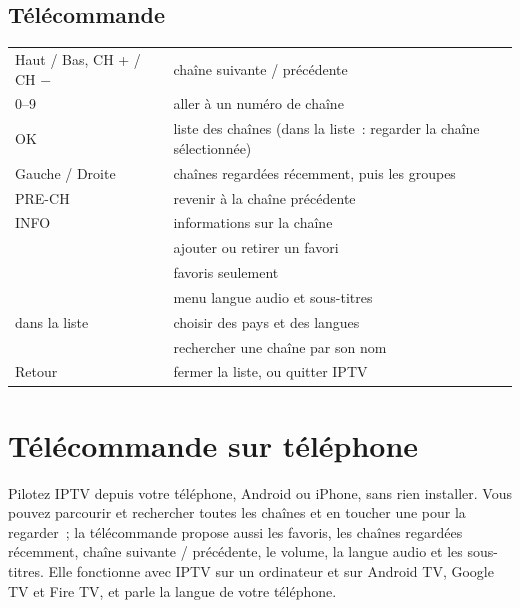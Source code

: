 \subsection{Télécommande}
\begin{xltabular}{\linewidth}{@{}KX@{}}
Haut / Bas, CH + / CH $-$ & chaîne suivante / précédente \\
0--9 & aller à un numéro de chaîne \\
OK & liste des chaînes (dans la liste~: regarder la chaîne sélectionnée) \\
Gauche / Droite & chaînes regardées récemment, puis les groupes \\
PRE-CH & revenir à la chaîne précédente \\
INFO & informations sur la chaîne \\
 & ajouter ou retirer un favori \\
 & favoris seulement \\
 & menu langue audio et sous-titres \\
 dans la liste & choisir des pays et des langues \\
 & rechercher une chaîne par son nom \\
Retour & fermer la liste, ou quitter IPTV \\
\bottomrule
\end{xltabular}


\section{Télécommande sur téléphone}
\label{sec:remote}

Pilotez IPTV depuis votre téléphone, Android ou iPhone, sans rien installer.
Vous pouvez parcourir et rechercher toutes les chaînes et en toucher une pour
la regarder~; la télécommande propose aussi les favoris, les chaînes
regardées récemment, chaîne suivante / précédente, le volume, la langue
audio et les sous-titres. Elle fonctionne avec IPTV sur un ordinateur et sur
Android TV, Google TV et Fire TV, et parle la langue de votre téléphone.

